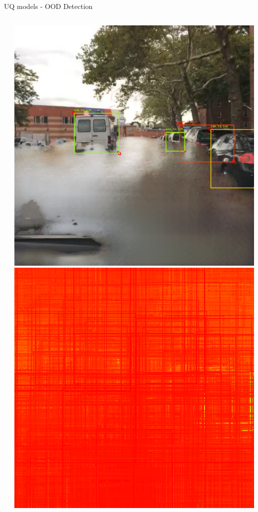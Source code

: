 \documentclass[10pt, aspectratio=169]{beamer}
\begin{document}
\begin{frame}[allowframebreaks]{UQ models - OOD Detection}
\begin{columns}
\begin{column}{.2\textwidth}
            \end{column}
            \begin{column}{.2\textwidth}
                \includegraphics[width=\textwidth]{images/uq_weathers/SubEns_Variance1.png}
                \includegraphics[width=\textwidth]{images/uq_weathers/SubEns_entropies_all1.png}

\end{column}
\end{columns}
\end{frame}
\end{document}
